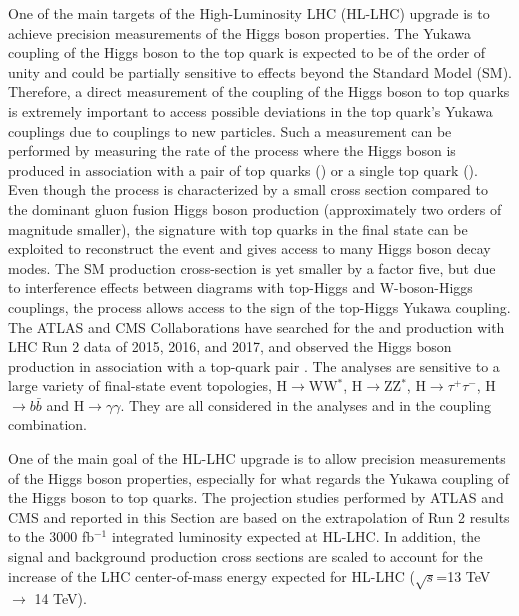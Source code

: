 One of the main targets of the High-Luminosity LHC (HL-LHC) upgrade is to achieve precision measurements of the Higgs boson properties. The Yukawa coupling of the Higgs boson to the top quark is expected to be of the order of unity and could be partially sensitive to effects beyond the Standard Model (SM). Therefore, a direct measurement of the coupling of the Higgs boson to top quarks is extremely important to access possible deviations in the top quark's Yukawa couplings due to couplings to new particles. Such a measurement can be performed by measuring the rate of the process where the Higgs boson is produced in association with a pair of top quarks (\ttH) or a single top quark (\tH). Even though the \ttH process is characterized by a small cross section compared to the dominant gluon fusion Higgs boson production (approximately two orders of magnitude smaller), the signature with top quarks in the final state can be exploited to reconstruct the event and gives access to many Higgs boson decay modes.
The SM \tH production cross-section is yet smaller by a factor five, but due to interference effects between diagrams with top-Higgs and W-boson-Higgs couplings, the process allows access to the sign of the top-Higgs Yukawa coupling.
The ATLAS and CMS Collaborations have searched for the \ttH and \tH production with LHC Run 2 data of 2015, 2016, and 2017, and observed the Higgs boson production in association with a top-quark pair \cite{Aaboud:2018urx,Sirunyan:2018hoz}. The analyses are sensitive to a large variety of final-state event topologies, H$\rightarrow$WW$^{*}$, H$\rightarrow$ZZ$^{*}$, H$\rightarrow \tau^{+}\tau^{-}$, H$\rightarrow b\bar{b}$ and H$\rightarrow \gamma\gamma$. They are all considered in the analyses and in the coupling combination.  

One of the main goal of the HL-LHC upgrade is to allow precision measurements of the Higgs boson properties, especially for what regards the Yukawa coupling of the Higgs boson to top quarks. The projection studies performed by ATLAS and CMS and reported in this Section are based on the extrapolation of Run 2 results to the 3000 fb$^{-1}$ integrated luminosity expected at HL-LHC. In addition, the signal and background production cross sections are scaled to account for the increase of the LHC center-of-mass energy expected for HL-LHC ($\sqrt{s}$=13 TeV $\rightarrow$ 14 TeV).

